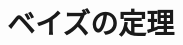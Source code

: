 \documentclass[../../../topic_probability-statistics]{subfiles}
\begin{document}
\sectionline
\section{ベイズの定理}

\todo{}
\end{document}
